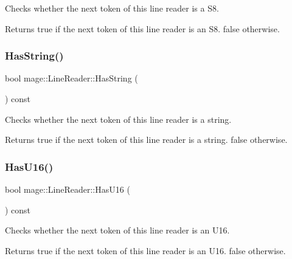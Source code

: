 Checks whether the next token of this line reader is a {\ttfamily S8}.

\begin{DoxyReturn}{Returns}
{\ttfamily true} if the next token of this line reader is an {\ttfamily S8}. {\ttfamily false} otherwise. 
\end{DoxyReturn}
\hypertarget{classmage_1_1_line_reader_a011b5a0d1bd2d157033e3bf7d7323aed}{}\label{classmage_1_1_line_reader_a011b5a0d1bd2d157033e3bf7d7323aed} 
\subsubsection{\texorpdfstring{Has\+String()}{HasString()}}
{\footnotesize\ttfamily bool mage\+::\+Line\+Reader\+::\+Has\+String (\begin{DoxyParamCaption}{ }\end{DoxyParamCaption}) const\hspace{0.3cm}{\ttfamily [protected]}}

Checks whether the next token of this line reader is a string.

\begin{DoxyReturn}{Returns}
{\ttfamily true} if the next token of this line reader is a string. {\ttfamily false} otherwise. 
\end{DoxyReturn}
\hypertarget{classmage_1_1_line_reader_af2c4d2414dbcaa2edb968725d2cd1555}{}\label{classmage_1_1_line_reader_af2c4d2414dbcaa2edb968725d2cd1555} 
\subsubsection{\texorpdfstring{Has\+U16()}{HasU16()}}
{\footnotesize\ttfamily bool mage\+::\+Line\+Reader\+::\+Has\+U16 (\begin{DoxyParamCaption}{ }\end{DoxyParamCaption}) const\hspace{0.3cm}{\ttfamily [protected]}}

Checks whether the next token of this line reader is an {\ttfamily U16}.

\begin{DoxyReturn}{Returns}
{\ttfamily true} if the next token of this line reader is an {\ttfamily U16}. {\ttfamily false} otherwise. 
\end{DoxyReturn}
\hypertarget{classmage_1_1_line_reader_a81ef171c6511a7b270a5b8d58181715c}{}\label{classmage_1_1_line_reader_a81ef171c6511a7b270a5b8d58181715c} 
